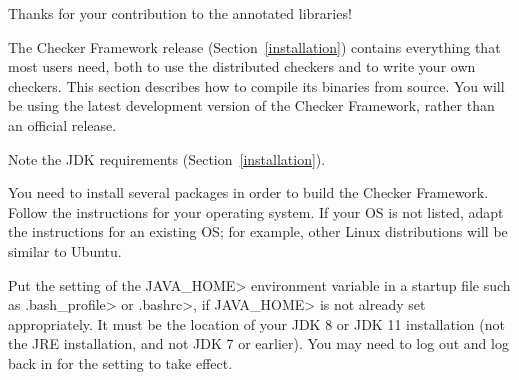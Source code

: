 Thanks for your contribution to the annotated libraries!



The Checker Framework release (Section~\ref{installation}) contains
everything that most users need, both to use the distributed checkers and
to write your own checkers.  This section describes how to compile its
binaries from source.  You will be using the latest development version of
the Checker Framework, rather than an official release.


Note the JDK requirements (Section~\ref{installation}).



You need to install several packages in order to build the Checker
Framework.
Follow the instructions for your operating system.
If your OS is not listed, adapt the instructions for an existing OS;
for example, other Linux distributions will be similar to Ubuntu.

Put the setting of the \<JAVA\_HOME> environment variable in a startup file
such as \<.bash\_profile> or \<.bashrc>, if \<JAVA\_HOME> is not already
set appropriately.  It must be the location of your JDK 8 or JDK 11
installation (not the JRE installation, and not JDK 7 or earlier).
You may need to log out and log back in for the setting to take effect.

